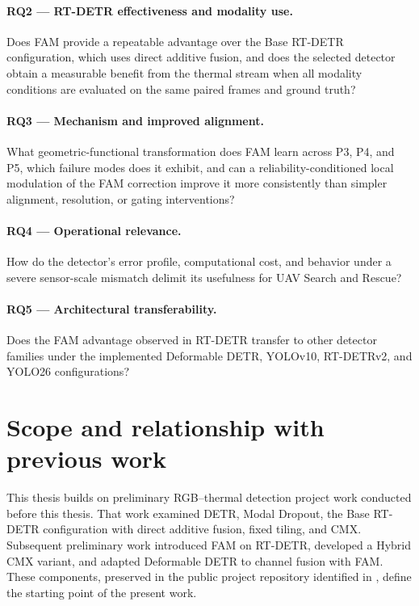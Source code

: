 \paragraph{RQ2 --- RT-DETR effectiveness and modality use.}
Does FAM provide a repeatable advantage over the Base RT-DETR configuration,
which uses direct additive fusion, and does the selected detector obtain a
measurable benefit from the thermal stream when all modality conditions are
evaluated on the same paired frames and ground truth?

\paragraph{RQ3 --- Mechanism and improved alignment.}
What geometric-functional transformation does FAM learn across P3, P4, and P5,
which failure modes does it exhibit, and can a reliability-conditioned local
modulation of the FAM correction improve it more consistently than simpler
alignment, resolution, or gating interventions?

\paragraph{RQ4 --- Operational relevance.}
How do the detector's error profile, computational cost, and behavior under a
severe sensor-scale mismatch delimit its usefulness for UAV Search and Rescue?

\paragraph{RQ5 --- Architectural transferability.}
Does the FAM advantage observed in RT-DETR transfer to other detector families
under the implemented Deformable DETR, YOLOv10, RT-DETRv2, and YOLO26
configurations?

\section{Scope and relationship with previous work}

This thesis builds on preliminary RGB--thermal detection project work conducted
before this thesis. That work examined DETR, Modal Dropout, the Base RT-DETR
configuration with direct additive fusion, fixed tiling, and CMX. Subsequent
preliminary work introduced FAM on RT-DETR, developed a Hybrid CMX variant, and
adapted Deformable DETR to channel fusion with FAM. These components, preserved
in the public project repository identified in , define
the starting point of the present work.

